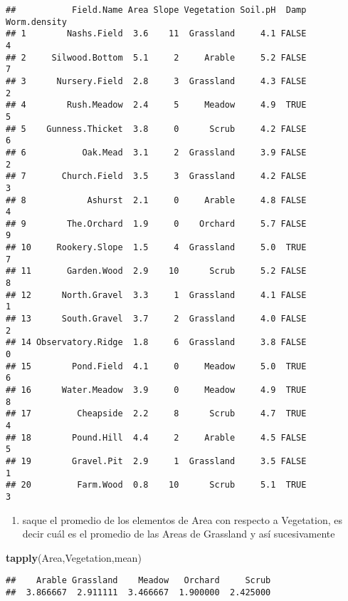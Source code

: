 \documentclass[]{article}
\newenvironment{Shaded}{\begin{snugshade}}{\end{snugshade}}
\newcommand{\KeywordTok}[1]{\textcolor[rgb]{0.13,0.29,0.53}{\textbf{#1}}}
\newcommand{\NormalTok}[1]{#1}
\providecommand{\tightlist}{%
  \setlength{\itemsep}{0pt}\setlength{\parskip}{0pt}}
\begin{document}
\begin{verbatim}
##           Field.Name Area Slope Vegetation Soil.pH  Damp Worm.density
## 1        Nashs.Field  3.6    11  Grassland     4.1 FALSE            4
## 2     Silwood.Bottom  5.1     2     Arable     5.2 FALSE            7
## 3      Nursery.Field  2.8     3  Grassland     4.3 FALSE            2
## 4        Rush.Meadow  2.4     5     Meadow     4.9  TRUE            5
## 5    Gunness.Thicket  3.8     0      Scrub     4.2 FALSE            6
## 6           Oak.Mead  3.1     2  Grassland     3.9 FALSE            2
## 7       Church.Field  3.5     3  Grassland     4.2 FALSE            3
## 8            Ashurst  2.1     0     Arable     4.8 FALSE            4
## 9        The.Orchard  1.9     0    Orchard     5.7 FALSE            9
## 10     Rookery.Slope  1.5     4  Grassland     5.0  TRUE            7
## 11       Garden.Wood  2.9    10      Scrub     5.2 FALSE            8
## 12      North.Gravel  3.3     1  Grassland     4.1 FALSE            1
## 13      South.Gravel  3.7     2  Grassland     4.0 FALSE            2
## 14 Observatory.Ridge  1.8     6  Grassland     3.8 FALSE            0
## 15        Pond.Field  4.1     0     Meadow     5.0  TRUE            6
## 16      Water.Meadow  3.9     0     Meadow     4.9  TRUE            8
## 17         Cheapside  2.2     8      Scrub     4.7  TRUE            4
## 18        Pound.Hill  4.4     2     Arable     4.5 FALSE            5
## 19        Gravel.Pit  2.9     1  Grassland     3.5 FALSE            1
## 20         Farm.Wood  0.8    10      Scrub     5.1  TRUE            3
\end{verbatim}

\begin{enumerate}
\def\labelenumi{\alph{enumi}.}
\tightlist
\item
  saque el promedio de los elementos de Area con respecto a Vegetation,
  es decir cuál es el promedio de las Areas de Grassland y así
  sucesivamente
\end{enumerate}

\begin{Shaded}
\begin{Highlighting}[]
\KeywordTok{tapply}\NormalTok{(Area,Vegetation,mean)}
\end{Highlighting}
\end{Shaded}

\begin{verbatim}
##    Arable Grassland    Meadow   Orchard     Scrub 
##  3.866667  2.911111  3.466667  1.900000  2.425000
\end{verbatim}
\end{document}
